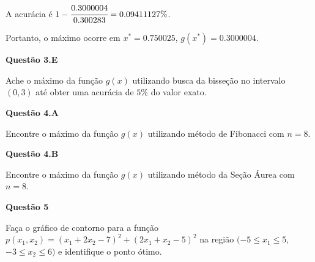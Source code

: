 \documentclass{rbfin}
\begin{document}
A acurácia é $1 - \cfrac{0.3000004}{0.300283} = 0.09411127\%$.

Portanto, o máximo ocorre em $x^* = 0.750025$, $g(x^*) = 0.3000004$.

\singlespacing

\vspace{6mm}

\large

\textbf{Questão 3.E}

\normalsize

\vspace{6mm}

\doublespacing

Ache o máximo da função $g(x)$ utilizando busca da bisseção no intervalo $(0, 3)$ até obter uma acurácia de $5\%$ do valor exato.

\singlespacing

\vspace{6mm}

\large

\textbf{Questão 4.A}

\normalsize

\vspace{6mm}

\doublespacing

Encontre o máximo da função $g(x)$ utilizando método de Fibonacci com $n = 8$.

\singlespacing

\vspace{6mm}

\large

\textbf{Questão 4.B}

\normalsize

\vspace{6mm}

\doublespacing

Encontre o máximo da função $g(x)$ utilizando método da Seção Áurea com $n = 8$.

\singlespacing

\vspace{6mm}

\large

\textbf{Questão 5}

\normalsize

\vspace{6mm}

\doublespacing

Faça o gráfico de contorno para a função $p(x_1, x_2) = (x_1 + 2x_2 - 7)^2 +(2x_1 + x_2 - 5)^2$ na região $(-5 \le x_1 \le 5$, $-3 \le x_2 \le 6)$ e identifique o ponto ótimo.
\end{document}
